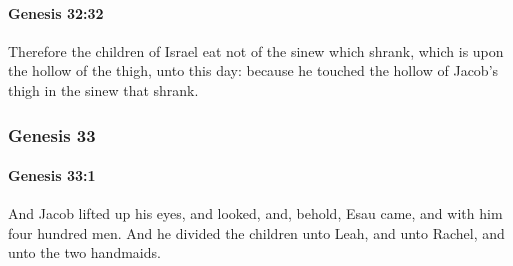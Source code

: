		\paragraph{Genesis 32:32} %
			\label{GENESIS-32-32}

			Therefore the children of Israel eat not of the sinew which shrank, which is upon the hollow of the thigh, unto this day: because he touched the hollow of Jacob's thigh in the sinew that shrank.

	\subsubsection{Genesis 33} %
		\label{GENESIS-33}

		\paragraph{Genesis 33:1} %
			\label{GENESIS-33-1}

			And Jacob lifted up his eyes, and looked, and, behold, Esau came, and with him four hundred men. And he divided the children unto Leah, and unto Rachel, and unto the two handmaids.

